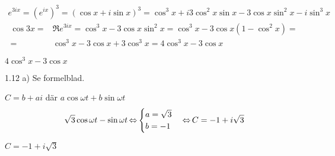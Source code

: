 \begin{task}{1.11}
	\begin{align*}
		e^{3ix}=
		(e^{ix})^3=
		(\cos x + i\sin x)^3=
		\cos^3x+i3\cos^2x\sin x-3\cos x\sin^2x-i\sin^3x
	\end{align*}
	\begin{align*}
	\cos 3x=
	&\Re e^{3ix}=
	\cos^3x-3\cos x\sin^2x=
	\cos^3x-3\cos x(1-\cos^2x)= \\ =
	&\cos^3x-3\cos x+3\cos^3x=
	4\cos^3x-3\cos x
	\end{align*}
	
	\ans $4\cos^3x-3\cos x$
\end{task}

\begin{task}{1.12 a)}
	Se formelblad.
	
	$C = b+ai$ där $a\cos\omega t + b\sin\omega t$
	\[\sqrt{3}\cos\omega t - \sin\omega t \operatorname{\Leftrightarrow}
	\begin{cases}
	a=\sqrt{3} \\
	b=-1
	\end{cases} \operatorname{\Leftrightarrow}
	C=-1+i\sqrt{3}\]
	
	\ans $C=-1+i\sqrt{3}$
\end{task}